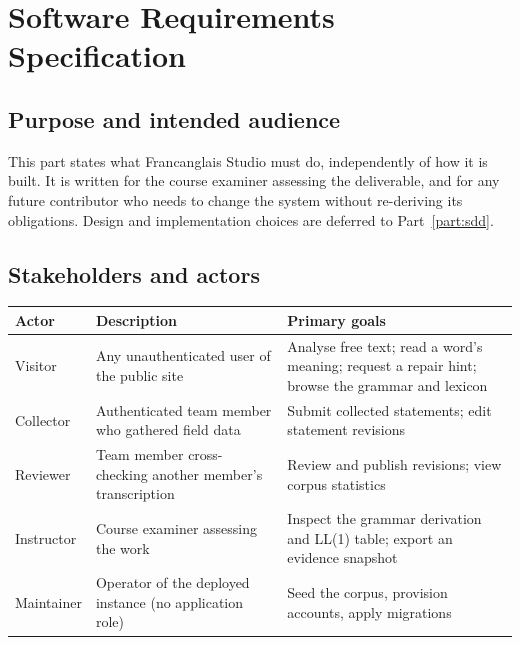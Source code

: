 \section{Software Requirements Specification}\label{part:srs}

\subsection{Purpose and intended audience}

This part states what Francanglais Studio must do, independently of how it is built. It
is written for the course examiner assessing the deliverable, and for any future
contributor who needs to change the system without re-deriving its obligations. Design
and implementation choices are deferred to Part~\ref{part:sdd}.

\subsection{Stakeholders and actors}

\begin{center}
\small
\begin{tabular}{@{}l p{4.4cm} p{6.1cm}@{}}
\toprule
\textbf{Actor} & \textbf{Description} & \textbf{Primary goals} \\
\midrule
Visitor &
  Any unauthenticated user of the public site &
  Analyse free text; read a word's meaning; request a repair hint; browse the grammar and lexicon \\
\addlinespace
Collector &
  Authenticated team member who gathered field data &
  Submit collected statements; edit statement revisions \\
\addlinespace
Reviewer &
  Team member cross-checking another member's transcription &
  Review and publish revisions; view corpus statistics \\
\addlinespace
Instructor &
  Course examiner assessing the work &
  Inspect the grammar derivation and LL(1) table; export an evidence snapshot \\
\addlinespace
Maintainer &
  Operator of the deployed instance (no application role) &
  Seed the corpus, provision accounts, apply migrations \\
\bottomrule
\end{tabular}
\end{center}


